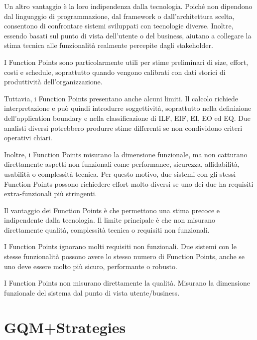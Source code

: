 Un altro vantaggio è la loro indipendenza dalla tecnologia. Poiché non dipendono dal linguaggio di programmazione, dal framework o dall'architettura scelta, consentono di confrontare sistemi sviluppati con tecnologie diverse. Inoltre, essendo basati sul punto di vista dell'utente o del business, aiutano a collegare la stima tecnica alle funzionalità realmente percepite dagli stakeholder.

\begin{notaslide}
I Function Points sono particolarmente utili per stime preliminari di size, effort, costi e schedule, soprattutto quando vengono calibrati con dati storici di produttività dell'organizzazione.
\end{notaslide}

Tuttavia, i Function Points presentano anche alcuni limiti. Il calcolo richiede interpretazione e può quindi introdurre soggettività, soprattutto nella definizione dell'application boundary e nella classificazione di ILF, EIF, EI, EO ed EQ. Due analisti diversi potrebbero produrre stime differenti se non condividono criteri operativi chiari.

Inoltre, i Function Points misurano la dimensione funzionale, ma non catturano direttamente aspetti non funzionali come performance, sicurezza, affidabilità, usabilità o complessità tecnica. Per questo motivo, due sistemi con gli stessi Function Points possono richiedere effort molto diversi se uno dei due ha requisiti extra-funzionali più stringenti.

\begin{notaesame}
Il vantaggio dei Function Points è che permettono una stima precoce e indipendente dalla tecnologia. Il limite principale è che non misurano direttamente qualità, complessità tecnica o requisiti non funzionali.
\end{notaesame}

\begin{notaprof}
I Function Points ignorano molti requisiti non funzionali. Due sistemi con le stesse funzionalità possono avere lo stesso numero di Function Points, anche se uno deve essere molto più sicuro, performante o robusto.
\end{notaprof}

\begin{notaesame}
I Function Points non misurano direttamente la qualità. Misurano la dimensione funzionale del sistema dal punto di vista utente/business.
\end{notaesame}

\section{GQM+Strategies}

